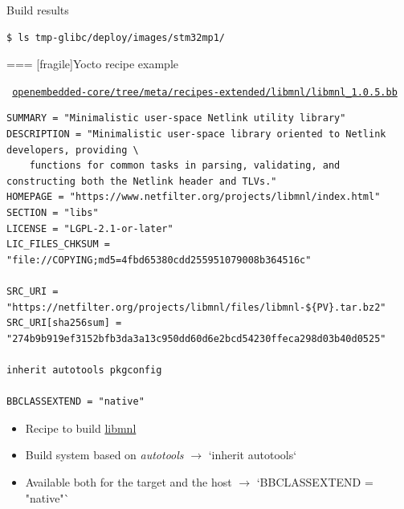   \begin{block}{Build results}
    {\footnotesize
\begin{verbatim}
$ ls tmp-glibc/deploy/images/stm32mp1/
\end{verbatim}
    }
  \end{block}


=== [fragile]{Yocto recipe example}
  \begin{block}{{\tt
\href{https://git.openembedded.org/openembedded-core/tree/meta/recipes-extended/libmnl/libmnl_1.0.5.bb}
     {openembedded-core/tree/meta/recipes-extended/libmnl/libmnl\_1.0.5.bb}}}
    {\tiny
\begin{verbatim}
SUMMARY = "Minimalistic user-space Netlink utility library"
DESCRIPTION = "Minimalistic user-space library oriented to Netlink developers, providing \
    functions for common tasks in parsing, validating, and constructing both the Netlink header and TLVs."
HOMEPAGE = "https://www.netfilter.org/projects/libmnl/index.html"
SECTION = "libs"
LICENSE = "LGPL-2.1-or-later"
LIC_FILES_CHKSUM = "file://COPYING;md5=4fbd65380cdd255951079008b364516c"

SRC_URI = "https://netfilter.org/projects/libmnl/files/libmnl-${PV}.tar.bz2"
SRC_URI[sha256sum] = "274b9b919ef3152bfb3da3a13c950dd60d6e2bcd54230ffeca298d03b40d0525"

inherit autotools pkgconfig

BBCLASSEXTEND = "native"
\end{verbatim}
    }
  \end{block}
  \begin{itemize}
  \item Recipe to build
    \href{https://www.netfilter.org/projects/libmnl/}{libmnl}
  \item Build system based on {\em autotools} $\rightarrow$
    `inherit autotools`
  \item Available both for the target and the host $\rightarrow$
    `BBCLASSEXTEND = "native"`
  \end{itemize}


